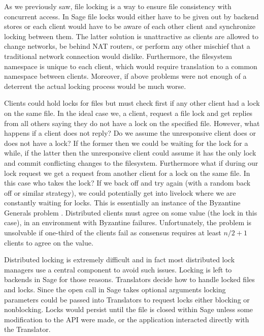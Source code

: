 As we previously saw, file locking is a way to ensure file consistency with concurrent access. In Sage file locks would either have to be given out by backend stores or each client would have to be aware of each other client and synchronize locking between them. The latter solution is unattractive as clients are allowed to change networks, be behind NAT routers, or perform any other mischief that a traditional network connection would dislike. Furthermore, the filesystem namespace is unique to each client, which would require translation to a common namespace between clients. Moreover, if above problems were not enough of a deterrent the actual locking process would be much worse. 

Clients could hold locks for files but must check first if any other client had a lock on the same file. In the ideal case we, a client, request a file lock and get replies from all others saying they do not have a lock on the specified file. However, what happens if a client does not reply? Do we assume the unresponsive client does or does not have a lock? If the former then we could be waiting for the lock for a while, if the latter then the unresponsive client could assume it has the only lock and commit conflicting changes to the filesystem. Furthermore what if during our lock request we get a request from another client for a lock on the same file. In this case who takes the lock? If we back off and try again (with a random back off or similar strategy), we could potentially get into livelock where we are constantly waiting for locks. This is essentially an instance of the Byzantine Generals problem \cite{Lamport1980,Lamport1983}. Distributed clients must agree on some value (the lock in this case), in an environment with Byzantine failures. Unfortunately, the problem is unsolvable if one-third of the clients fail as consensus requires at least $n/2 + 1$ clients to agree on the value.

Distributed locking is extremely difficult and in fact most distributed lock managers use a central component to avoid such issues. Locking is left to backends in Sage for those reasons. Translators decide how to handle locked files and locks. Since the open call in Sage takes optional arguments locking parameters could be passed into Translators to request locks either blocking or nonblocking. Locks would persist until the file is closed within Sage unless some modification to the API were made, or the application interacted directly with the Translator.

